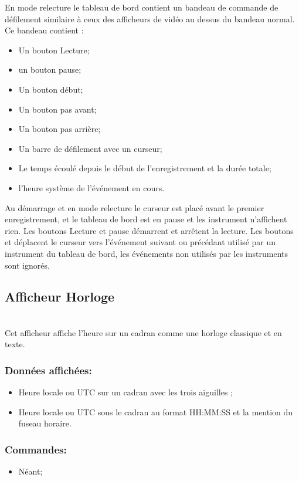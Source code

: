 \documentclass[a4paper,11pt]{report}
\begin{document}
En mode relecture le tableau de bord contient un bandeau de commande de défilement similaire à ceux des afficheurs de vidéo au dessus du bandeau normal.
Ce bandeau contient :
\begin{itemize}
    \item Un bouton Lecture;
    \item un bouton pause;
    \item Un bouton début;
    \item Un bouton pas avant;
    \item Un bouton pas arrière;
    \item Un barre de défilement avec un curseur;
    \item Le temps écoulé depuis le début de l'enregistrement et la durée totale;
    \item l'heure système de l'événement en cours.
\end{itemize}
Au démarrage et en mode relecture le curseur est placé avant le premier enregistrement, et le tableau de bord est en pause et
les instrument n'affichent rien.
Les boutons Lecture et pause démarrent et arrêtent la lecture.
Les boutons  et  déplacent le curseur
vers l'événement suivant ou précédant utilisé par un instrument du
tableau de bord, les événements non utilisés par les instruments sont ignorés.

\subsection{Afficheur Horloge}

\\
Cet afficheur affiche l'heure sur un cadran comme une horloge classique
et en texte.
\subsubsection{Données affichées:}
\begin{itemize}
	\item Heure locale ou UTC sur un cadran avec les trois aiguilles ;
	\item Heure locale ou UTC sous le cadran au format HH:MM:SS et la mention du fuseau horaire.
\end{itemize}

\subsubsection{Commandes:}
\begin{itemize}
	\item Néant;
\end{itemize}
\end{document}
